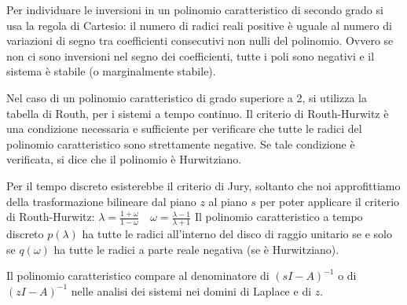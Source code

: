 Per individuare le inversioni in un polinomio caratteristico di secondo grado si usa la regola di Cartesio: il numero di radici
reali positive è uguale al numero di variazioni di segno tra coefficienti consecutivi non nulli del polinomio. Ovvero se non ci
sono inversioni nel segno dei coefficienti, tutte i poli sono negativi e il sistema è stabile (o marginalmente stabile).

Nel caso di un polinomio caratteristico di grado superiore a 2, si utilizza la tabella di Routh, per i sistemi a tempo continuo.
Il criterio di Routh-Hurwitz è una condizione necessaria e sufficiente per verificare che tutte le radici del polinomio
caratteristico sono strettamente negative. Se tale condizione è verificata, si dice che il polinomio è Hurwitziano.

Per il tempo discreto esisterebbe il criterio di Jury, soltanto che noi approfittiamo della trasformazione bilineare dal piano
\(z\) al piano \(s\) per poter applicare il criterio di Routh-Hurwitz: \(\lambda=\frac{1+\omega}{1-\omega} \quad \omega=\frac{\lambda-1}{\lambda+1}\)
Il polinomio caratteristico a tempo discreto \(p(\lambda)\) ha tutte le radici all'interno del disco di raggio unitario se e
solo se \(q(\omega)\) ha tutte le radici a parte reale negativa (se è Hurwitziano).

Il polinomio caratteristico compare al denominatore di \((sI-A)^{-1}\) o di \((zI-A)^{-1}\) nelle analisi dei sistemi nei domini
di Laplace e di \(z\).

\newpage

